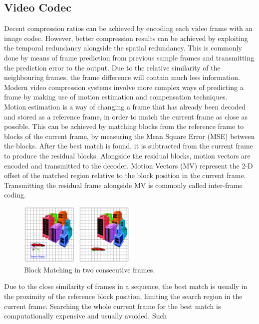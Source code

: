 \documentclass[a4paper,11pt,oneside]{article}
\begin{document}
\subsection{Video Codec}
\indent Decent compression ratios can be achieved by encoding each video frame with an image codec. However, better compression results can be
achieved by exploiting the temporal redundancy alongside the spatial redundancy. This is commonly done by means of frame prediction from
previous sample frames and transmitting the prediction error to the output. Due to the relative similarity of the neighbouring frames, the
frame difference will contain much less information. Modern video compression systems involve more complex ways of predicting a frame by making
use of motion estimation and compensation techniques. \\
\indent Motion estimation is a way of changing a frame that has already been decoded and stored as a reference frame, in order to match the current frame as close as possible. This can be achieved by matching blocks from the reference frame to blocks of the current frame, by measuring the Mean Square Error (MSE) between the blocks. After the best match is found, it is subtracted from the current frame to produce the residual blocks. Alongside the residual blocks, motion vectors are encoded and transmitted to the decoder. Motion Vectors (MV) represent the 2-D offset of the matched region relative to the block position in the current frame. Transmitting the residual frame alongside MV is commonly called inter-frame coding. \\
\begin{figure}[h]
    \centering  
    \includegraphics[width=0.5\textwidth]{../figures/motion_vectors.pdf}
    \caption{Block Matching in two consecutive frames. \cite[week 14]{wang_video_slides}}
    \label{figure:block_matching}
\end{figure}
Due to the close similarity of frames in a sequence, the best match is usually in the proximity of the reference block position, limiting the
search region in the current frame. Searching the whole current frame for the best match is computationally expensive and usually avoided. Such
\end{document}
